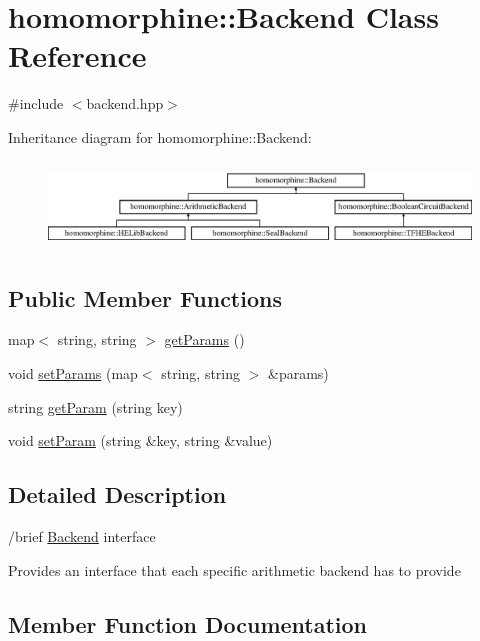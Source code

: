 \hypertarget{classhomomorphine_1_1_backend}{}\section{homomorphine\+::Backend Class Reference}
\label{classhomomorphine_1_1_backend}


{\ttfamily \#include $<$backend.\+hpp$>$}

Inheritance diagram for homomorphine\+::Backend\+:\begin{figure}[H]
\begin{center}
\leavevmode
\includegraphics[height=2.333333cm]{classhomomorphine_1_1_backend}
\end{center}
\end{figure}
\subsection*{Public Member Functions}
\begin{DoxyCompactItemize}
\item 
map$<$ string, string $>$ \mbox{\hyperlink{classhomomorphine_1_1_backend_a107e05b3bd55271356a57fbc0c1df091}{get\+Params}} ()
\item 
void \mbox{\hyperlink{classhomomorphine_1_1_backend_aed04b9aa4eb2c08801e099b16b4da4b0}{set\+Params}} (map$<$ string, string $>$ \&params)
\item 
string \mbox{\hyperlink{classhomomorphine_1_1_backend_a34191d0dbdd9e300a88242156f90eb9b}{get\+Param}} (string key)
\item 
void \mbox{\hyperlink{classhomomorphine_1_1_backend_aacb924f4de6d50347d550da85aec15a2}{set\+Param}} (string \&key, string \&value)
\end{DoxyCompactItemize}


\subsection{Detailed Description}
/brief \mbox{\hyperlink{classhomomorphine_1_1_backend}{Backend}} interface

Provides an interface that each specific arithmetic backend has to provide 

\subsection{Member Function Documentation}
\mbox{\label{classhomomorphine_1_1_backend_a34191d0dbdd9e300a88242156f90eb9b}} 
